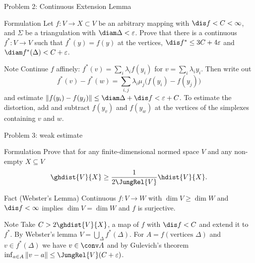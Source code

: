 \documentclass[aspectratio=169,11pt]{beamer}
\begin{document}
\begin{frame}{Problem \textup{2}: Continuous Extension Lemma}
\begin{block}{Formulation}
Let $f\colon V \to X \subset V$ be an arbitrary mapping with $\dis f < C < \infty$, and $\Sigma$ be a triangulation with $\diam\Delta < \varepsilon$. Prove that there is a continuous $f^*\colon V \to V$ such that $f^*(y) = f(y)$ at the vertices, $\dis f^* \le 3C + 4\varepsilon$ and $\diam f^*(\Delta) < C+\varepsilon$.
\end{block}
\begin{block}{Note}
Continue $f$ affinely\textup{:} $f^*(v) = \sum_i \lambda_i f(y_i)$ for $v = \sum_i \lambda_i y_i$. Then write out
\[
f^*(v) - f^*(w) = \sum_{i,j}\lambda_i\mu_j\bigl(f(y_i) - f(y_j)\bigr)
\]
and estimate $\|f(y_i) - f(y_j)\| \le \diam\Delta + \dis f < \varepsilon + C$. To estimate the distortion, add and subtract $f(y_v)$ and $f(y_w)$ at the vertices of the simplexes containing $v$ and $w$.
\end{block}
\end{frame}

\begin{frame}{Problem \textup{3}: weak estimate}
\begin{block}{Formulation}
Prove that for any finite-dimensional normed space $V$ and any non-empty $X \subseteq V$
\[
\ghdist{V}{X} \ge \frac{1}{2\JungRel{V}} \hdist{V}{X}.
\]
\end{block}
\begin{block}{Fact (Webster's Lemma)}
Continuous $f\colon V \to W$ with $\dim V \ge \dim W$ and $\dis f < \infty$ implies $\dim V = \dim W$ and $f$ is surjective.
\end{block}
\begin{block}{Note}
Take $C > 2\ghdist{V}{X}$, a map of $f$ with $\dis f < C$ and extend it to $f^*$. By Webster's lemma $V = \bigcup_\Delta f^*(\Delta)$. For $A = f(\text{vertices }\Delta)$ and $v \in f^*(\Delta)$ we have $v \in \conv A$ and by Gulevich's theorem $\inf_{a\in A}\|v-a\| \le \JungRel{V}(C+\varepsilon)$.
\end{block}
\end{frame}
\end{document}
